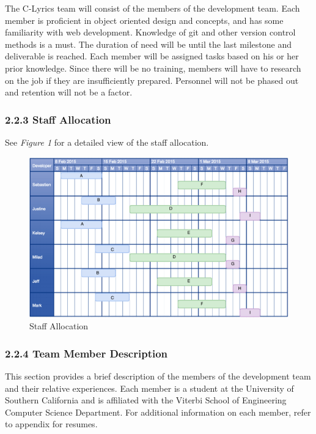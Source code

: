 \documentclass[]{article}
\begin{document}
The C-Lyrics team will consist of the members of the development team.
Each member is proficient in object oriented design and concepts, and
has some familiarity with web development. Knowledge of git and other
version control methods is a must. The duration of need will be until
the last milestone and deliverable is reached. Each member will be
assigned tasks based on his or her prior knowledge. Since there will be
no training, members will have to research on the job if they are
insufficiently prepared. Personnel will not be phased out and retention
will not be a factor.

\subsubsection{2.2.3 Staff Allocation}\label{staff-allocation}

See \emph{Figure 1} for a detailed view of the staff allocation.

\begin{figure}[htbp]
\centering
\includegraphics{StaffAllocation.png}
\caption{Staff Allocation}
\end{figure}

\subsubsection{2.2.4 Team Member
Description}\label{team-member-description}

This section provides a brief description of the members of the
development team and their relative experiences. Each member is a
student at the University of Southern California and is affiliated with
the Viterbi School of Engineering Computer Science Department. For
additional information on each member, refer to appendix for resumes.
\end{document}
